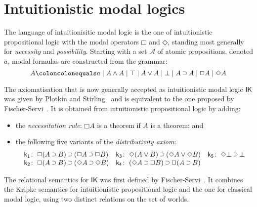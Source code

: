 \documentclass[twoside]{aiml18}
\newcommand*{\ax}[1]{\mathsf{#1}}
\newcommand*{\kax}[1][]		{\ax{k_{#1}}}
\newcommand*{\IK}{\mathsf{IK}}
\newcommand*{\NOT}{\neg}
\newcommand*{\AND}{\mathbin{\wedge}}
\newcommand*{\TOP}{\mathord{\top}}
\newcommand*{\OR}{\mathbin{\vee}}
\newcommand*{\BOT}{\mathord{\bot}}
\newcommand*{\IMP}{\mathbin{\scalebox{.9}{\raise.2ex\hbox{$\supset$}}}}
\newcommand*{\BOX}{\mathord{\Box}}
\newcommand*{\DIA}{\mathord{\Diamond}}
\begin{document}
\section{Intuitionistic modal logics}

	The language of {intuitionisitic modal logic} is the one of intuitionistic propositional logic with the modal operators $\BOX$ and $\DIA$, standing most generally for \emph{necessity} and \emph{possibility}.
	Starting with a set $\mathcal{A}$ of atomic propositions, denoted $a$, modal formulas are constructed from the grammar:
	$$
	A \coloncolonequals
	a \mid A \AND A \mid \TOP \mid A \OR A \mid \BOT \mid A \IMP A \mid \BOX A \mid \DIA A
	$$

%

The axiomatisation that is now generally accepted as intuitionistic modal logic $\IK$ was given by Plotkin and Stirling~\cite{Plotkin} and is equivalent to the one proposed by Fischer-Servi~\cite{Fischer}.
%
It is obtained from intuitionistic propositional logic by adding:
\begin{itemize}
\item the \emph{necessitation rule}: $\BOX A$ is a theorem if $A$ is a theorem; and
\item the following five variants of the \emph{distributivity axiom}:
\begin{equation*}
\label{eq:ik}%
\begin{array}[t]{r@{\;}l@{\quad}r@{\;}l@{\quad}r@{\;}l}
\kax[1]\colon&\BOX(A\IMP B)\IMP(\BOX A\IMP\BOX B)
&
\kax[3]\colon&\DIA(A\OR B)\IMP(\DIA A\OR\DIA B)
&
\kax[5]\colon&\DIA\BOT\IMP\BOT
\\
\kax[2]\colon&\BOX(A\IMP B)\IMP(\DIA A\IMP\DIA B)
&
\kax[4]\colon&(\DIA A\IMP \BOX B)\IMP\BOX(A\IMP B)\\%
\end{array}
\end{equation*}
\end{itemize}

The relational semantics for $\IK$ was first defined by Fischer-Servi~\cite{Fischer}.
%
It combines the Kripke semantics for intuitionistic propositional logic and the one for classical modal logic, using two distinct relations on the set of worlds.
\end{document}
